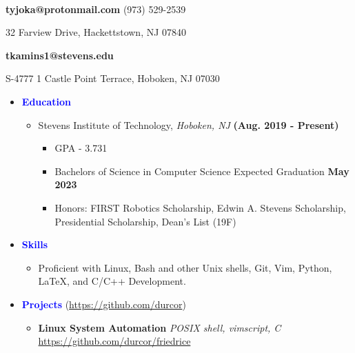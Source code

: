 \documentclass[11pt]{article}
\begin{document}
\begin{flushleft}

    \makebox[\textwidth]{\LARGE \textbf{\textcolor{teal}{Tyler Kaminski}}}\\

\setlength{\parindent}{0.5in}

\begin{multicols}{2}
    \textbf{tyjoka@protonmail.com} \textemdash{} (973) 529-2539 

32 Farview Drive, Hackettstown, NJ 07840

    \textbf{tkamins1@stevens.edu}

S-4777 1 Castle Point Terrace, Hoboken, NJ 07030
\end{multicols}

\begin{itemize}
    \item[] \Large \textcolor{blue}{\textbf{Education}} \normalsize
        \begin{itemize}
            \item Stevens Institute of Technology, \textit{Hoboken, NJ}  \hfill{\textbf{(Aug. 2019 - Present)}}
                \begin{itemize}
                    \item GPA - 3.731
                    \item Bachelors of Science in Computer Science \hfill{Expected Graduation \textbf{May 2023}}
                    \item Honors: FIRST Robotics Scholarship, Edwin A. Stevens Scholarship, Presidential Scholarship, Dean’s List (19F)
                \end{itemize}
        \end{itemize}
    \item[] \Large \textcolor{blue}{\textbf{Skills}} \normalsize
        \begin{itemize}
            \item Proficient with Linux, Bash and other Unix shells, Git, Vim, Python, LaTeX, and C/C++ Development.
        \end{itemize}
    \item[] \Large \textcolor{blue}{\textbf{Projects}} (\url{https://github.com/durcor}) \normalsize
        \begin{itemize}
            \item \textbf{Linux System Automation} \textit{POSIX shell, vimscript, C} \hfill{\url{https://github.com/durcor/friedrice}}
                \begin{itemize}

\end{itemize}
\end{itemize}
\end{itemize}
\end{flushleft}
\end{document}
